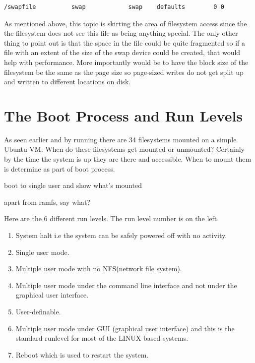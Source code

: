 \begin{lstlisting}
/swapfile          swap            swap    defaults        0 0
\end{lstlisting}

\noindent
As mentioned above, this topic is skirting the area of filesystem access since the the filesystem does not see this file as being anything special. The only other thing to point out is that the space in the file could be quite fragmented so if a file with an extent of the size of the swap device could be created, that would help with performance. More importantly would be to have the block size of the filesystem be the same as the page size so page-sized writes do not get split up and written to different locations on disk.


\section{The Boot Process and Run Levels}

As seen earlier and by running  there are 34 filesystems mounted on a simple Ubuntu VM. When do these filesystems get mounted or unmounted? Certainly by the time the system is up they are there and accessible. When to mount them is determine as part of boot process.

boot to single user and show what's mounted

apart from ramfs, say what?

Here are the 6 different run levels. The run level number is on the left.

\begin{enumerate}
	\item System halt i.e the system can be safely powered off with no activity.
	\item Single user mode.
	\item Multiple user mode with no NFS(network file system).
	\item Multiple user mode under the command line interface and not under the graphical user interface.
	\item User-definable.
	\item Multiple user mode under GUI (graphical user interface) and this is the standard runlevel for most of the LINUX based systems.
	\item Reboot which is used to restart the system.
\end{enumerate}


